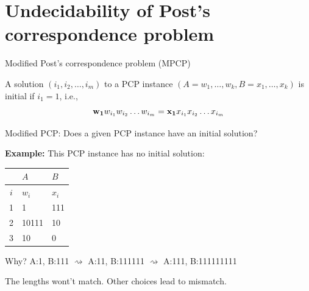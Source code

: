 \documentclass[handout]{beamer}
\begin{document}
\section*{Undecidability of Post's correspondence problem}

  
\begin{frame}{Modified Post's correspondence problem (MPCP)}
    
    A solution $(i_1,i_2,\dots,i_m)$ to a PCP instance $(A=w_1,\ldots, w_k,B=x_1,\ldots, x_k)$ is \alert{initial} if $i_1=1$, i.e., 
    $$
    {\bf w_1}w_{i_1} w_{i_2} \ldots w_{i_m}={\bf x_1}x_{i_1} x_{i_2} \ldots x_{i_m}
    $$
    
    \alert{Modified PCP}: Does a given PCP instance have an \alert{initial} solution?

       
    \textbf{Example:} This PCP instance has no initial solution:

    \begin{center}
        \small
        \begin{tabular}{c | l | l}
            & $A$ & $B$\\
            \hline
            $i$ & $w_i$ & $x_i$ \\
            \hline
            1 & 1 & 111\\
            2 & 10111 & 10\\
            3 & 10 & 0 
        \end{tabular}
    \end{center}

    Why? A:1, B:111 $\rightsquigarrow$ A:11, B:111111 $\rightsquigarrow$ A:111, B:111111111
        
    The lengths wont't match. Other choices lead to mismatch.

\end{frame}
\end{document}
